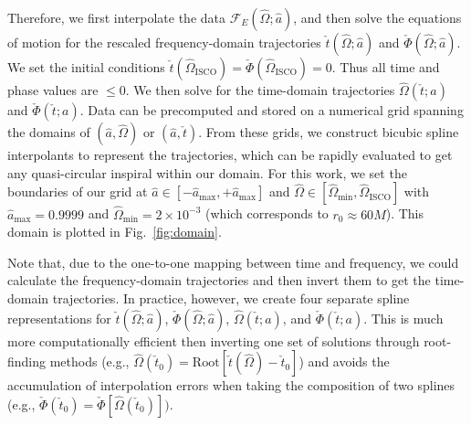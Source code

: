 \documentclass[%
 reprint,
 nofootinbib,
 amsmath,amssymb,
 aps,
 prd,
]{revtex4-2}
\begin{document}

Therefore, we first interpolate the data $\mathcal{F}_E(\hat{\Omega}; \hat{a})$, and then solve the equations of motion for the rescaled frequency-domain trajectories $\check{t}(\hat{\Omega}; \hat{a})$ and $\check{\Phi}(\hat{\Omega}; \hat{a})$. We set the initial conditions $\check{t}(\hat{\Omega}_\mathrm{ISCO}) = \check{\Phi}(\hat{\Omega}_\mathrm{ISCO}) = 0$. Thus all time and phase values are $\leq 0$. We then solve for the time-domain trajectories $\hat{\Omega}(\check{t}; a)$ and $\check{\Phi}(\check{t}; a)$. Data can be precomputed and stored on a numerical grid spanning the domains of $(\hat{a}, \hat{\Omega})$ or $(\hat{a}, \check{t})$. From these grids, we construct bicubic spline interpolants to represent the trajectories, which can be rapidly evaluated to get any quasi-circular inspiral within our domain. For this work, we set the boundaries of our grid at $\hat{a} \in [-\hat{a}_\mathrm{max}, +\hat{a}_\mathrm{max}]$ and $\hat{\Omega} \in [\hat{\Omega}_\mathrm{min}, \hat{\Omega}_\mathrm{ISCO}]$ with $\hat{a}_\mathrm{max} = 0.9999$ and $\hat{\Omega}_\mathrm{min} = 2\times 10^{-3}$ (which corresponds to $r_0 \approx 60 M$). This domain is plotted in Fig.~\ref{fig:domain}.

Note that, due to the one-to-one mapping between time and frequency, we could calculate the frequency-domain trajectories and then invert them to get the time-domain trajectories. In practice, however, we create four separate spline representations for $\check{t}(\hat{\Omega}; \hat{a})$, $\check{\Phi}(\hat{\Omega}; \hat{a})$, $\hat{\Omega}(\check{t}; a)$, and $\check{\Phi}(\check{t}; a)$. This is much more computationally efficient then inverting one set of solutions through root-finding methods (e.g., $\hat{\Omega}(\check{t}_0) = \mathrm{Root}[\check{t}(\hat{\Omega}) - \check{t}_0]$) and avoids the accumulation of interpolation errors when taking the composition of two splines (e.g., $\check{\Phi}(\check{t}_0) = \check{\Phi}[\hat{\Omega}(\check{t}_0)])$.
\end{document}
